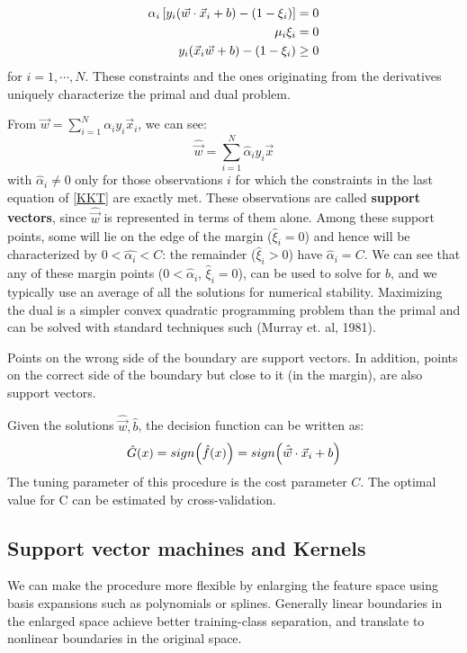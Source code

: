 \documentclass[12pt, letterpaper]{article}
\theoremstyle{definition}
\DeclarePairedDelimiter\autobracket{(}{)}
\newcommand{\br}[1]{\autobracket*{#1}}
\begin{document}
\begin{equation}
\begin{aligned}
\alpha_i \left[ y_i\br{\vec{w}\cdot\vec{x}_i+b}-\br{1-\xi_i}\right] &=0\\
\mu_i \xi_i &= 0\\
y_i(\vec{x}_i\vec{w}+b) - (1 - \xi_i) &\ge 0
\end{aligned}
\label{KKT}
\end{equation}
for $i=1,\cdots, N$. These constraints and the ones originating from the derivatives uniquely characterize the primal and dual problem.

From $\vec{w} = \sum_{i=1}^N  \alpha_i y_i \vec{x}_i$, we can see:
\begin{equation}
\hat{\vec{w}} = \sum_{i=1}^N \hat{\alpha}_i y_i \vec{x}
\end{equation}
with $\hat{\alpha}_i \ne 0$ only for those observations $i$ for which the constraints in the last equation of \autoref{KKT} are exactly met. These observations are called \textbf{support vectors}, since $\hat{\vec{w}}$ is represented in terms of them alone. Among these support points, some will lie on the edge of the margin ($\hat{\xi}_i=0$) and hence will be characterized by $0 < \hat{\alpha_i} <C$: the remainder ($\hat{\xi}_i>0$) have $\hat{\alpha}_i=C$. We can see that any of these margin points ($0<\hat{\alpha}_i$, $\hat{\xi}_i = 0$), can be used to solve for $b$, and we typically use an average of all the solutions for numerical stability. Maximizing the dual is a simpler convex quadratic programming problem than the primal and can be solved with standard techniques such (Murray et. al, 1981).

Points on the wrong side of the boundary are support vectors. In addition, points on the correct side of the boundary but close to it (in the margin), are also support vectors. 

Given the solutions $\hat{\vec{w}}, \hat{b}$, the decision function can be written as:
\begin{equation}
\hat{G} (x) = sign \br{\hat{f}(x)}= sign\br{\hat{\vec{w}}\cdot \vec{x}_i+b}
\end{equation}
The tuning parameter of this procedure is the cost parameter $C$. The optimal value for C can be estimated by cross-validation.
\subsection{Support vector machines and Kernels}
We can make the procedure more flexible by enlarging the feature space using basis expansions such as polynomials or splines. Generally linear boundaries in the enlarged space achieve better training-class separation, and translate to nonlinear boundaries in the original space. 
\end{document}

